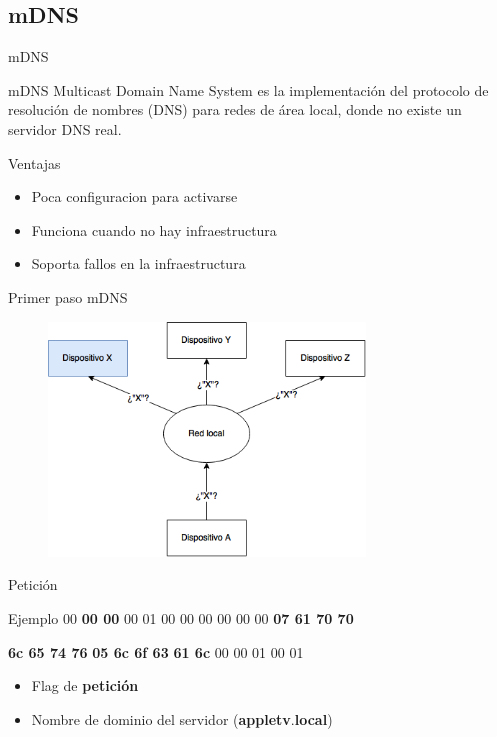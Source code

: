\subsection{mDNS}

\begin{frame}{mDNS}
	\begin{block}{mDNS}
		Multicast Domain Name System es la implementación del protocolo de resolución de nombres (DNS) para redes de área local, donde no existe un servidor DNS real.		
	\end{block}
	
	\begin{block}{Ventajas}
		\begin{itemize}
			\item Poca configuracion para activarse
			\item Funciona cuando no hay infraestructura
			\item Soporta fallos en la infraestructura
		\end{itemize}
	\end{block}
\end{frame}


\begin{frame}{Primer paso mDNS}
	\begin{figure}[H]
		\centering
		\includegraphics[width=0.75\textwidth]{./Imagenes/mdns1.png}
		\label{fig:mdns1}
	\end{figure}
\end{frame}


\begin{frame}{Petición}
	\begin{exampleblock}{Ejemplo}
		 00 \textbf<2>{00 00} 00 01 00 00 \hspace{0.1cm} 00 00 00 00  \textbf<3>{07 61 70 70}
		
		\textbf<3> {6c 65 74 76} \textbf<4>{05 6c 6f 63} \hspace{0.1cm} \textbf<4>{61 6c} 00 00 01 00 01
		
	\end{exampleblock}
	
	\begin{itemize}
		\item<1-> Flag de \textbf<2->{petición}
		\item<1-> Nombre de dominio del servidor (\textbf<3>{appletv}.\textbf<4>{local})
	\end{itemize}
\end{frame}


